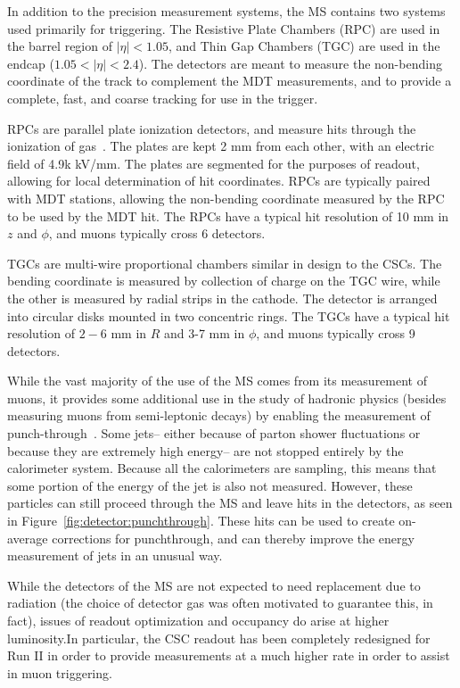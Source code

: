 In addition to the precision measurement systems, the MS contains two systems used primarily for triggering. The Resistive Plate Chambers (RPC) are used in the barrel region of $|\eta| < 1.05$, and Thin Gap Chambers (TGC) are used in the endcap ($1.05 < |\eta| < 2.4$). The detectors are meant to measure the non-bending coordinate of the track to complement the MDT measurements, and to provide a complete, fast, and coarse tracking for use in the trigger. 

RPCs are parallel plate ionization detectors, and measure hits through the ionization of gas~\cite{Detectors,ATLASPaper}. The plates are kept 2 mm from each other, with an electric field of 4.9k kV/mm. The plates are segmented for the purposes of readout, allowing for local determination of hit coordinates. RPCs are typically paired with MDT stations, allowing the non-bending coordinate measured by the RPC to be used by the MDT hit. The RPCs have a typical hit resolution of 10 mm in $z$ and $\phi$, and muons typically cross 6 detectors. 

TGCs are multi-wire proportional chambers similar in design to the CSCs.  The bending coordinate is measured by collection of charge on the TGC wire, while the other is measured by radial strips in the cathode. The detector is arranged into circular disks mounted in two concentric rings. The TGCs have a typical hit resolution of $2-6$ mm in $R$ and 3-7 mm in $\phi$, and muons typically cross 9 detectors.

While the vast majority of the use of the MS comes from its measurement of muons, it provides some additional use in the study of hadronic physics (besides measuring muons from semi-leptonic decays) by enabling the measurement of punch-through~\cite{JES2010}. Some jets-- either because of parton shower fluctuations or because they are extremely high energy-- are not stopped entirely by the calorimeter system. Because all the calorimeters are sampling, this means that some portion of the energy of the jet is also not measured. However, these particles can still proceed through the MS and leave hits in the detectors, as seen in Figure~\ref{fig:detector:punchthrough}. These hits can be used to create on-average corrections for punchthrough, and can thereby improve the energy measurement of jets in an unusual way.

While the detectors of the MS are not expected to need replacement due to radiation (the choice of detector gas was often motivated to guarantee this, in fact), issues of readout optimization and occupancy do arise at higher luminosity.In particular, the CSC readout has been completely redesigned for Run II in order to provide measurements at a much higher rate in order to assist in muon triggering. 

